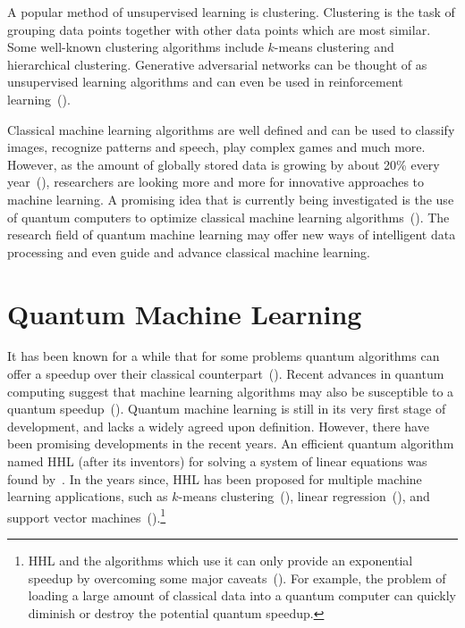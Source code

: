\documentclass[a4paper,10pt]{article}
\begin{document}
A popular method of unsupervised learning is clustering.
Clustering is the task of grouping data points together with other data points which are most similar.
Some well-known clustering algorithms include $k$-means clustering and hierarchical clustering.
Generative adversarial networks can be thought of as unsupervised learning algorithms and can even be used in reinforcement learning~(\cite{ho2016generative}).

Classical machine learning algorithms are well defined and can be used to classify images, recognize patterns and speech, play complex games and much more.
However, as the amount of globally stored data is growing by about 20\% every year~(\cite{hilbert2011world}), researchers are looking more and more for innovative approaches to machine learning.
A promising idea that is currently being investigated is the use of quantum computers to optimize classical machine learning algorithms~(\cite{schuld2015introduction}).
The research field of quantum machine learning may offer new ways of intelligent data processing and even guide and advance classical machine learning.

\section{Quantum Machine Learning} \label{sec:quantum-ml}
It has been known for a while that for some problems quantum algorithms can offer a speedup over their classical counterpart~(\cite{nielsen-chuang}).
Recent advances in quantum computing suggest that machine learning algorithms may also be susceptible to a quantum speedup~(\cite{lee2019experimental, lloyd2013quantum, gao2018quantum, yoo2014quantum, biamonte2017quantum}).
Quantum machine learning is still in its very first stage of development, and lacks a widely agreed upon definition.
However, there have been promising developments in the recent years.
An efficient quantum algorithm named HHL (after its inventors) for solving a system of linear equations was found by~\textcite{harrow2009quantum}.
In the years since, HHL has been proposed for multiple machine learning applications, such as $k$-means clustering~(\cite{lloyd2013quantum}), linear regression~(\cite{schuld2016prediction, yu2017improved, wang2017quantum}), and support vector machines~(\cite{rebentrost2014quantum}).\footnote{HHL and the algorithms which use it can only provide an exponential speedup by overcoming some major caveats~(\cite{aaronson2015read}). For example, the problem of loading a large amount of classical data into a quantum computer can quickly diminish or destroy the potential quantum speedup.}
\end{document}
